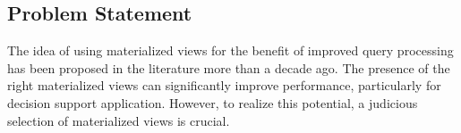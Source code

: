 







\subsection{Problem Statement}
The idea of using materialized views for the benefit of improved query processing has been proposed in the literature more than a decade ago.\cite{Blakeley1986EfficientlyUM} The presence of the right materialized views can significantly improve performance, particularly for decision support application. However, to realize this potential, a judicious selection of materialized views is crucial.\cite{agrawal2000automated}\vspace{.4cm}

